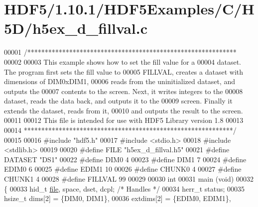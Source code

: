 \hypertarget{_h_d_f5_21_810_81_2_h_d_f5_examples_2_c_2_h5_d_2h5ex__d__fillval_8c_source}{}\section{H\+D\+F5/1.10.1/\+H\+D\+F5\+Examples/\+C/\+H5\+D/h5ex\+\_\+d\+\_\+fillval.c}
\label{_h_d_f5_21_810_81_2_h_d_f5_examples_2_c_2_h5_d_2h5ex__d__fillval_8c_source}

\begin{DoxyCode}
00001 \textcolor{comment}{/************************************************************}
00002 \textcolor{comment}{}
00003 \textcolor{comment}{  This example shows how to set the fill value for a}
00004 \textcolor{comment}{  dataset.  The program first sets the fill value to}
00005 \textcolor{comment}{  FILLVAL, creates a dataset with dimensions of DIM0xDIM1,}
00006 \textcolor{comment}{  reads from the uninitialized dataset, and outputs the}
00007 \textcolor{comment}{  contents to the screen.  Next, it writes integers to the}
00008 \textcolor{comment}{  dataset, reads the data back, and outputs it to the}
00009 \textcolor{comment}{  screen.  Finally it extends the dataset, reads from it,}
00010 \textcolor{comment}{  and outputs the result to the screen.}
00011 \textcolor{comment}{}
00012 \textcolor{comment}{  This file is intended for use with HDF5 Library version 1.8}
00013 \textcolor{comment}{}
00014 \textcolor{comment}{ ************************************************************/}
00015 
00016 \textcolor{preprocessor}{#include "hdf5.h"}
00017 \textcolor{preprocessor}{#include <stdio.h>}
00018 \textcolor{preprocessor}{#include <stdlib.h>}
00019 
00020 \textcolor{preprocessor}{#define FILE            "h5ex\_d\_fillval.h5"}
00021 \textcolor{preprocessor}{#define DATASET         "DS1"}
00022 \textcolor{preprocessor}{#define DIM0            4}
00023 \textcolor{preprocessor}{#define DIM1            7}
00024 \textcolor{preprocessor}{#define EDIM0           6}
00025 \textcolor{preprocessor}{#define EDIM1           10}
00026 \textcolor{preprocessor}{#define CHUNK0          4}
00027 \textcolor{preprocessor}{#define CHUNK1          4}
00028 \textcolor{preprocessor}{#define FILLVAL         99}
00029 
00030 \textcolor{keywordtype}{int}
00031 main (\textcolor{keywordtype}{void})
00032 \{
00033     hid\_t           \hyperlink{structfile}{file}, space, dset, dcpl;    \textcolor{comment}{/* Handles */}
00034     herr\_t          status;
00035     hsize\_t         dims[2] = \{DIM0, DIM1\},
00036                     extdims[2] = \{EDIM0, EDIM1\},

\end{DoxyCode}
